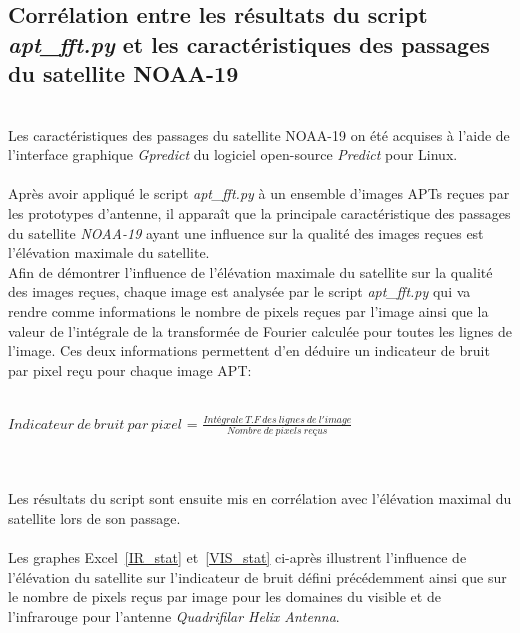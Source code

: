 \documentclass[12pt,fleqn]{book} %
\begin{document}
\subsection{Corrélation entre les résultats du script \emph{apt\_fft.py} et les caractéristiques des passages du satellite NOAA-19}
~\\Les caractéristiques des passages du satellite NOAA-19 on été acquises à l'aide de l'interface graphique \emph{Gpredict} du logiciel open-source \emph{Predict} pour Linux.
~\\\\Après avoir appliqué le script \emph{apt\_fft.py} à un ensemble d'images APTs reçues par les prototypes d'antenne, il apparaît que la principale caractéristique des passages du satellite \emph{NOAA-19} ayant une influence sur la qualité des images reçues est l'élévation maximale du satellite.
~\\Afin de démontrer l'influence de l'élévation maximale du satellite sur la qualité des images reçues, chaque image est analysée par le script \emph{apt\_fft.py} qui va rendre comme informations le nombre de pixels reçues par l'image ainsi que la valeur de l'intégrale de la transformée de Fourier calculée pour toutes les lignes de l'image.
Ces deux informations permettent d'en déduire un indicateur de bruit par pixel reçu pour chaque image APT:
~\\\\
\begin{center}
 $ Indicateur\ de\ bruit\ par\ pixel $ = $\frac{Intégrale\ T.F\ des\ lignes\ de\ l'image}{Nombre\ de\ pixels\ reçus} $
\end{center}
~\\\\
Les résultats du script sont ensuite mis en corrélation avec l'élévation maximal du satellite lors de son passage. 
~\\\\Les graphes Excel~\underline{\color{blue}\ref{IR_stat}} et~\underline{\color{blue}\ref{VIS_stat}} ci-après illustrent l'influence de l'élévation du satellite sur l'indicateur de bruit défini précédemment ainsi que sur le nombre de pixels reçus par image pour les domaines du visible et de l'infrarouge pour l'antenne \emph{Quadrifilar Helix Antenna}.
\end{document}
